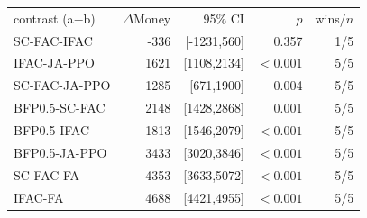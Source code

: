 \begin{tabular}{lrrrr}
\hline
contrast (a$-$b) & $\Delta$Money & 95\% CI & $p$ & wins/$n$\\
SC-FAC-IFAC & -336 & [-1231,560] & 0.357 & 1/5\\
IFAC-JA-PPO & 1621 & [1108,2134] & $<0.001$ & 5/5\\
SC-FAC-JA-PPO & 1285 & [671,1900] & 0.004 & 5/5\\
BFP0.5-SC-FAC & 2148 & [1428,2868] & 0.001 & 5/5\\
BFP0.5-IFAC & 1813 & [1546,2079] & $<0.001$ & 5/5\\
BFP0.5-JA-PPO & 3433 & [3020,3846] & $<0.001$ & 5/5\\
SC-FAC-FA & 4353 & [3633,5072] & $<0.001$ & 5/5\\
IFAC-FA & 4688 & [4421,4955] & $<0.001$ & 5/5\\
\hline
\end{tabular}